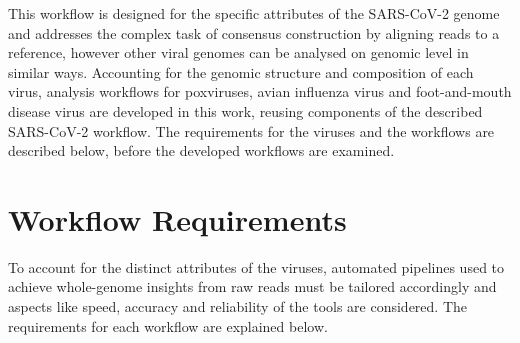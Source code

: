 This workflow is designed for the specific attributes of the \ac{SARS-CoV-2} genome and addresses the complex task of consensus construction by aligning reads to a reference, however other viral genomes can be analysed on genomic level in similar ways. Accounting for the genomic structure and composition of each virus, analysis workflows for poxviruses, avian influenza virus and foot-and-mouth disease virus are developed in this work, reusing components of the described \ac{SARS-CoV-2} workflow. The requirements for the viruses and the workflows are described below, before the developed workflows are examined.

\section{Workflow Requirements}
To account for the distinct attributes of the viruses, automated pipelines used to achieve whole-genome insights from raw reads must be tailored accordingly and aspects like speed, accuracy and reliability of the tools are considered. The requirements for each workflow are explained below.

